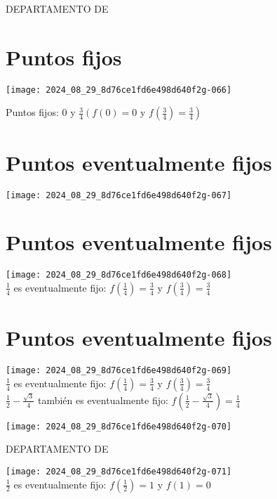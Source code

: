 \documentclass[11pt]{beamer}
\begin{document}
DEPARTAMENTO DE

\section*{Puntos fijos}
\begin{center}
\texttt{[image: 2024\_08\_29\_8d76ce1fd6e498d640f2g-066]}
\end{center}

Puntos fijos: 0 y $\frac{3}{4}\left(f(0)=0\right.$ y $\left.f\left(\frac{3}{4}\right)=\frac{3}{4}\right)$

\section*{Puntos eventualmente fijos}
\begin{center}
\texttt{[image: 2024\_08\_29\_8d76ce1fd6e498d640f2g-067]}
\end{center}

\section*{Puntos eventualmente fijos}
\texttt{[image: 2024\_08\_29\_8d76ce1fd6e498d640f2g-068]}\\
$\frac{1}{4}$ es eventualmente fijo: $f\left(\frac{1}{4}\right)=\frac{3}{4}$ y $f\left(\frac{3}{4}\right)=\frac{3}{4}$

\section*{Puntos eventualmente fijos}
\texttt{[image: 2024\_08\_29\_8d76ce1fd6e498d640f2g-069]}\\
$\frac{1}{4}$ es eventualmente fijo: $f\left(\frac{1}{4}\right)=\frac{3}{4}$ y $f\left(\frac{3}{4}\right)=\frac{3}{4}$\\
$\frac{1}{2}-\frac{\sqrt{3}}{4}$ también es eventualmente fijo: $f\left(\frac{1}{2}-\frac{\sqrt{3}}{4}\right)=\frac{1}{4}$

\begin{center}
\texttt{[image: 2024\_08\_29\_8d76ce1fd6e498d640f2g-070]}
\end{center}

DEPARTAMENTO DE

\texttt{[image: 2024\_08\_29\_8d76ce1fd6e498d640f2g-071]}\\
$\frac{1}{2}$ es eventualmente fijo: $f\left(\frac{1}{2}\right)=1$ y $f(1)=0$
\end{document}
